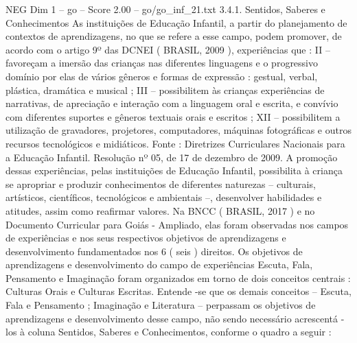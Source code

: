 \begin{textsample}{NEG Dim 1 – go – Score 2.00 – go/go\_inf\_21.txt}  \label{ex:f1_neg_191}
3.4.1.
Sentidos, Saberes e Conhecimentos As instituições de Educação Infantil, a partir do planejamento de contextos de aprendizagens, no que se refere a esse campo, podem promover, de acordo com o artigo 9º das DCNEI ( BRASIL, 2009 ), experiências que : II – favoreçam a imersão das crianças nas diferentes linguagens e o progressivo domínio por elas de vários gêneros e formas de expressão : gestual, verbal, plástica, dramática e musical ; III – possibilitem às crianças experiências de narrativas, de apreciação e interação com a linguagem oral e escrita, e convívio com diferentes suportes e gêneros textuais orais e escritos ; XII – possibilitem a utilização de gravadores, projetores, computadores, máquinas fotográficas e outros recursos tecnológicos e midiáticos.
Fonte : Diretrizes Curriculares Nacionais para a Educação Infantil.
Resolução nº 05, de 17 de dezembro de 2009.
A promoção dessas experiências, pelas instituições de Educação Infantil, possibilita à criança se apropriar e produzir conhecimentos de diferentes naturezas – culturais, artísticos, científicos, tecnológicos e ambientais –, desenvolver habilidades e atitudes, assim como reafirmar valores.
Na BNCC ( BRASIL, 2017 ) e no Documento Curricular para Goiás - Ampliado, elas foram observadas nos campos de experiências e nos seus respectivos objetivos de aprendizagens e desenvolvimento fundamentados nos 6 ( seis ) direitos.
Os objetivos de aprendizagens e desenvolvimento do campo de experiências Escuta, Fala, Pensamento e Imaginação foram organizados em torno de dois conceitos centrais : Culturas Orais e Culturas Escritas.
Entende -se que os demais conceitos – Escuta, Fala e Pensamento ; Imaginação e Literatura – perpassam os objetivos de aprendizagens e desenvolvimento desse campo, não sendo necessário acrescentá -los à coluna Sentidos, Saberes e Conhecimentos, conforme o quadro a seguir :

\end{textsample}

